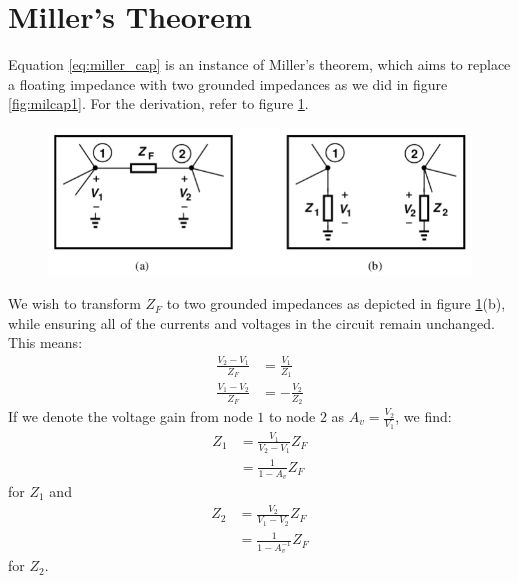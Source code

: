 \section{Miller's Theorem}
\label{sec:miller_theorem}
Equation \ref{eq:miller_cap} is an instance of Miller's theorem, which aims to replace a floating impedance with two grounded impedances as we did in figure \ref{fig:milcap1}. For the derivation, refer to figure \ref{fig:miller}.

\begin{figure}[h!]
	\centering
	\includegraphics[width=12cm]{figures/ch03/miller.jpg}
	\caption{}
	\label{fig:miller}
\end{figure}
We wish to transform $Z_F$ to two grounded impedances as depicted in figure \ref{fig:miller}(b), while ensuring all of the currents and voltages in the circuit remain unchanged. This means:
\begin{align*}
	\frac{V_2 - V_1}{Z_F} &= \frac{V_1}{Z_1} \\
	\frac{V_1 - V_2}{Z_F}  &= -\frac{V_2}{Z_2}
\end{align*}
If we denote the voltage gain from node $1$ to node $2$ as $A_v = \frac{V_2}{V_1}$, we find:
\begin{align*}
	Z_1 &= \frac{V_1}{V_2 - V_1} Z_F\\
		&= \frac{1}{1-A_v} Z_F
\end{align*}
for $Z_1$ and 
\begin{align*}
	Z_2 &= \frac{V_2}{V_1 - V_2} Z_F\\
	&= \frac{1}{1-A_v^{-1}} Z_F
\end{align*}
for $Z_2$.
